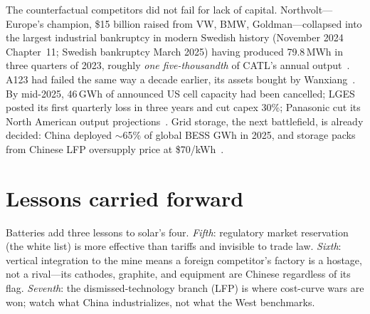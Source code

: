 The counterfactual competitors did not fail for lack of capital. Northvolt---Europe's champion, \$15 billion raised from VW, BMW, Goldman---collapsed into the largest industrial bankruptcy in modern Swedish history (November 2024 Chapter~11; Swedish bankruptcy March 2025) having produced 79.8\,MWh in three quarters of 2023, roughly \emph{one five-thousandth} of CATL's annual output~\cite{northvolt}. A123 had failed the same way a decade earlier, its assets bought by Wanxiang~\cite{a123}. By mid-2025, 46\,GWh of announced US cell capacity had been cancelled; LGES posted its first quarterly loss in three years and cut capex 30\%; Panasonic cut its North American output projections~\cite{us-cancellations,lg-loss}. Grid storage, the next battlefield, is already decided: China deployed $\sim$65\% of global BESS GWh in 2025, and storage packs from Chinese LFP oversupply price at \$70/kWh~\cite{bess-2025,bnef-2025}.

\section{Lessons carried forward}

Batteries add three lessons to solar's four. \emph{Fifth}: regulatory market reservation (the white list) is more effective than tariffs and invisible to trade law. \emph{Sixth}: vertical integration to the mine means a foreign competitor's factory is a hostage, not a rival---its cathodes, graphite, and equipment are Chinese regardless of its flag. \emph{Seventh}: the dismissed-technology branch (LFP) is where cost-curve wars are won; watch what China industrializes, not what the West benchmarks.
